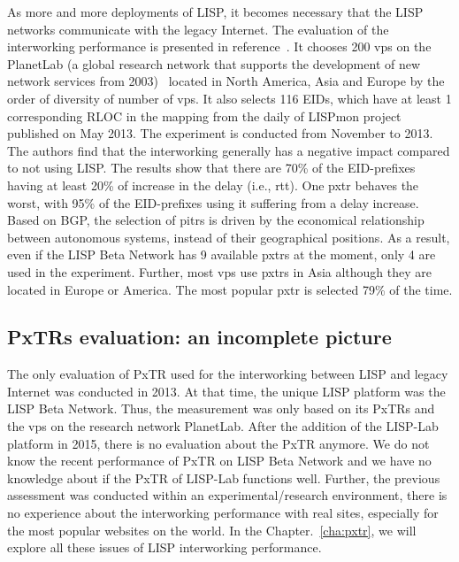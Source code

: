 As more and more deployments of LISP, it becomes necessary that the LISP networks communicate with the legacy Internet. The evaluation of the interworking performance is presented in reference~\cite{coras2014performance}. It chooses 200 \acrshort{vp}s on the PlanetLab (a global research network that supports the development of new network services from 2003)~\cite{PlanetLab} located in North America, Asia and Europe by the order of diversity of number of \acrshort{vp}s. It also selects 116 EIDs, which have at least 1 corresponding RLOC in the mapping from the daily of LISPmon project~\cite{lispmon} published on May  2013. The experiment is conducted from November  to  2013. The authors find that the interworking generally has a negative impact compared to not using LISP. The results show that there are 70\% of the EID-prefixes having at least 20\% of increase in the delay (i.e., \acrfull{rtt}). One \acrshort{pxtr} behaves the worst, with 95\% of the EID-prefixes using it suffering from a delay increase. Based on BGP, the selection of \acrshort{pitr}s is driven by the economical relationship between autonomous systems, instead of their geographical positions. As a result, even if the LISP Beta Network has 9 available \acrshort{pxtr}s at the moment, only 4 are used in the experiment. Further, most \acrshort{vp}s use \acrshort{pxtr}s in Asia although they are located in Europe or America. The most popular \acrshort{pxtr} is selected 79\% of the time.

\subsection{PxTRs evaluation: an incomplete picture}
\label{subsec:interworking_missing}
The only evaluation of PxTR used for the interworking between LISP and legacy Internet was conducted in 2013. At that time, the unique LISP platform was the LISP Beta Network. Thus, the measurement was only based on its PxTRs and the \acrshort{vp}s on the research network PlanetLab. After the addition of the LISP-Lab platform in 2015, there is no evaluation about the PxTR anymore. We do not know the recent performance of PxTR on LISP Beta Network and we have no knowledge about if the PxTR of LISP-Lab functions well. Further, the previous assessment was conducted within an experimental/research environment, there is no experience about the interworking performance with real sites, especially for the most popular websites on the world. In the Chapter.~\ref{cha:pxtr}, we will explore all these issues of LISP interworking performance.

